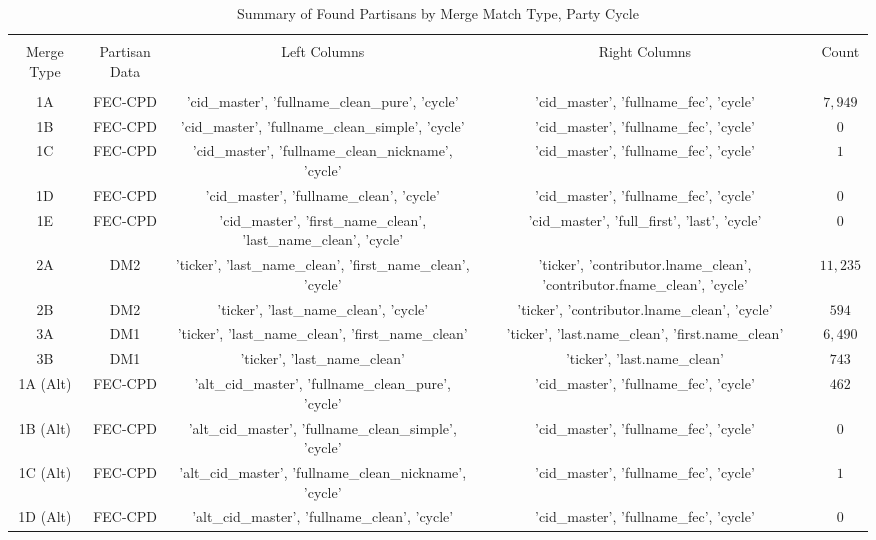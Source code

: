 
\begin{table}[!htbp] \centering 
  \caption{Summary of Found Partisans by Merge Match Type, Party Cycle} 
  \label{} 
\scriptsize 
\begin{tabular}{@{\extracolsep{5pt}} ccccc} 
\\[-1.8ex]\hline 
\hline \\[-1.8ex] 
Merge Type & Partisan Data & Left Columns & Right Columns & Count \\ 
\hline \\[-1.8ex] 
1A & FEC-CPD & 'cid\_master', 'fullname\_clean\_pure', 'cycle' & 'cid\_master', 'fullname\_fec', 'cycle' & $7,949$ \\ 
1B & FEC-CPD & 'cid\_master', 'fullname\_clean\_simple', 'cycle' & 'cid\_master', 'fullname\_fec', 'cycle' & $0$ \\ 
1C & FEC-CPD & 'cid\_master', 'fullname\_clean\_nickname', 'cycle' & 'cid\_master', 'fullname\_fec', 'cycle' & $1$ \\ 
1D & FEC-CPD & 'cid\_master', 'fullname\_clean', 'cycle' & 'cid\_master', 'fullname\_fec', 'cycle' & $0$ \\ 
1E & FEC-CPD & 'cid\_master', 'first\_name\_clean', 'last\_name\_clean', 'cycle' & 'cid\_master', 'full\_first', 'last', 'cycle' & $0$ \\ 
2A & DM2 & 'ticker', 'last\_name\_clean', 'first\_name\_clean', 'cycle' & 'ticker', 'contributor.lname\_clean', 'contributor.fname\_clean', 'cycle' & $11,235$ \\ 
2B & DM2 & 'ticker', 'last\_name\_clean', 'cycle' & 'ticker', 'contributor.lname\_clean', 'cycle' & $594$ \\ 
3A & DM1 & 'ticker', 'last\_name\_clean', 'first\_name\_clean' & 'ticker', 'last.name\_clean', 'first.name\_clean' & $6,490$ \\ 
3B & DM1 & 'ticker', 'last\_name\_clean' & 'ticker', 'last.name\_clean' & $743$ \\ 
1A (Alt) & FEC-CPD & 'alt\_cid\_master', 'fullname\_clean\_pure', 'cycle' & 'cid\_master', 'fullname\_fec', 'cycle' & $462$ \\ 
1B (Alt) & FEC-CPD & 'alt\_cid\_master', 'fullname\_clean\_simple', 'cycle' & 'cid\_master', 'fullname\_fec', 'cycle' & $0$ \\ 
1C (Alt) & FEC-CPD & 'alt\_cid\_master', 'fullname\_clean\_nickname', 'cycle' & 'cid\_master', 'fullname\_fec', 'cycle' & $1$ \\ 
1D (Alt) & FEC-CPD & 'alt\_cid\_master', 'fullname\_clean', 'cycle' & 'cid\_master', 'fullname\_fec', 'cycle' & $0$ \\ 

\end{tabular}
\end{table}
